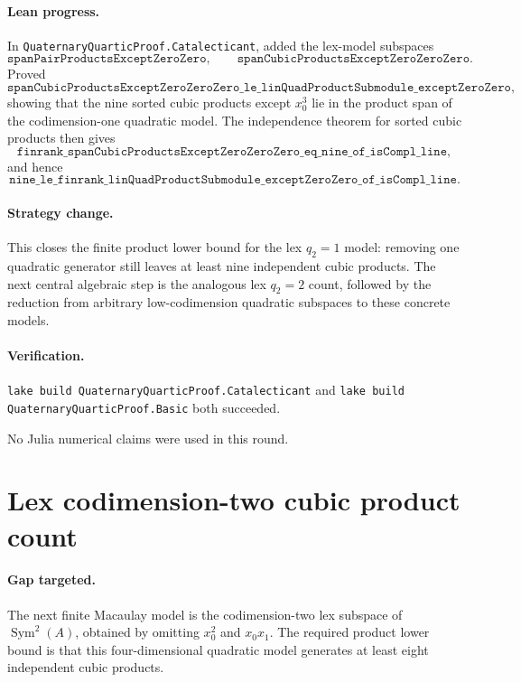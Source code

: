 \documentclass[11pt]{article}
\begin{document}
\paragraph{Lean progress.}
In \texttt{QuaternaryQuarticProof.Catalecticant}, added the lex-model
subspaces
\[
\texttt{spanPairProductsExceptZeroZero},
\qquad
\texttt{spanCubicProductsExceptZeroZeroZero}.
\]
Proved
\[
\texttt{spanCubicProductsExceptZeroZeroZero\_le\_linQuadProductSubmodule\_exceptZeroZero},
\]
showing that the nine sorted cubic products except \(x_0^3\) lie in the
product span of the codimension-one quadratic model.  The independence theorem
for sorted cubic products then gives
\[
\texttt{finrank\_spanCubicProductsExceptZeroZeroZero\_eq\_nine\_of\_isCompl\_line},
\]
and hence
\[
\texttt{nine\_le\_finrank\_linQuadProductSubmodule\_exceptZeroZero\_of\_isCompl\_line}.
\]

\paragraph{Strategy change.}
This closes the finite product lower bound for the lex \(q_2=1\) model:
removing one quadratic generator still leaves at least nine independent cubic
products.  The next central algebraic step is the analogous lex \(q_2=2\)
count, followed by the reduction from arbitrary low-codimension quadratic
subspaces to these concrete models.

\paragraph{Verification.}
\texttt{lake build QuaternaryQuarticProof.Catalecticant} and
\texttt{lake build QuaternaryQuarticProof.Basic} both succeeded.

No Julia numerical claims were used in this round.

\section*{Lex codimension-two cubic product count}

\paragraph{Gap targeted.}
The next finite Macaulay model is the codimension-two lex subspace of
\(\operatorname{Sym}^2(A)\), obtained by omitting \(x_0^2\) and
\(x_0x_1\).  The required product lower bound is that this four-dimensional
quadratic model generates at least eight independent cubic products.
\end{document}
